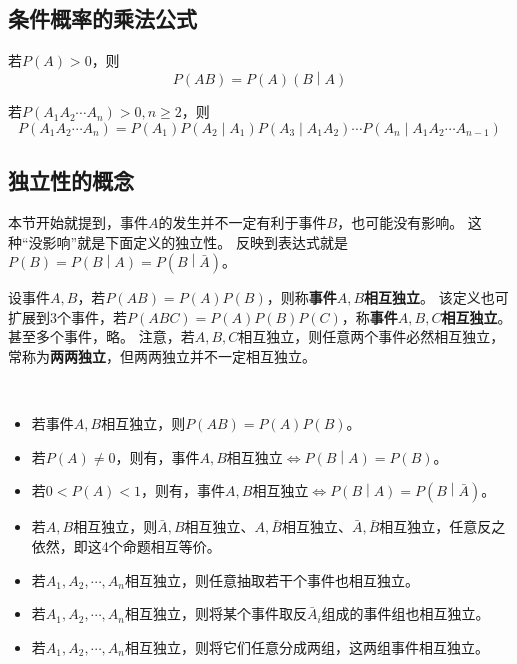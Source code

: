 \subsection{条件概率的乘法公式}

\begin{theorem}[乘法公式]
若$P\left( A \right) >0$，则
\[
P\left( AB \right) =P\left( A \right) \left( B \middle| A \right)
\]
\end{theorem}

\begin{corollary}[乘法公式]
若$P\left( A_1A_2\cdots A_n \right) >0,n\geqslant 2$，则
\[
P\left( A_1A_2\cdots A_n \right) =P\left( A_1 \right) P\left( A_2 \middle| A_1 \right) P\left( A_3 \middle| A_1A_2 \right) \cdots P\left( A_n \middle| A_1A_2\cdots A_{n-1} \right)
\]
\end{corollary}


\subsection{独立性的概念}

\begin{tcolorbox}
本节开始就提到，事件$A$的发生并不一定有利于事件$B$，也可能没有影响。
这种“没影响”就是下面定义的独立性。
反映到表达式就是$P\left( B \right) =P\left( B \middle| A \right) =P\left( B \middle| \bar{A} \right) $。
\end{tcolorbox}

\begin{definition}[独立性]
设事件$A,B$，若$P\left( AB \right) =P\left( A \right) P\left( B \right) $，则称{\bf 事件$A,B$相互独立}。
该定义也可扩展到3个事件，若$P\left( ABC \right) =P\left( A \right) P\left( B \right) P\left( C \right) $，称{\bf 事件$A,B,C$相互独立}。
甚至多个事件，略。
注意，若$A,B,C$相互独立，则任意两个事件必然相互独立，常称为{\bf 两两独立}，但两两独立并不一定相互独立。
\end{definition}

\begin{theorem}
~
\begin{itemize}
    \item 若事件$A,B$相互独立，则$P\left( AB \right) =P\left( A \right) P\left( B \right) $。
    \item 若$P\left( A \right) \ne 0$，则有，事件$A,B$相互独立$\Leftrightarrow P\left( B \middle| A \right) =P\left( B \right) $。
    \item 若$0<P\left( A \right) <1$，则有，事件$A,B$相互独立$\Leftrightarrow P\left( B \middle| A \right) =P\left( B \middle| \bar{A} \right) $。
    \item 若$A,B$相互独立，则$\bar{A},B$相互独立、$A,\bar{B}$相互独立、$\bar{A},\bar{B}$相互独立，任意反之依然，即这4个命题相互等价。
    \item 若$A_1,A_2,\cdots ,A_n$相互独立，则任意抽取若干个事件也相互独立。
    \item 若$A_1,A_2,\cdots ,A_n$相互独立，则将某个事件取反$\bar{A}_i$组成的事件组也相互独立。
    \item 若$A_1,A_2,\cdots ,A_n$相互独立，则将它们任意分成两组，这两组事件相互独立。
\end{itemize}
\end{theorem}

